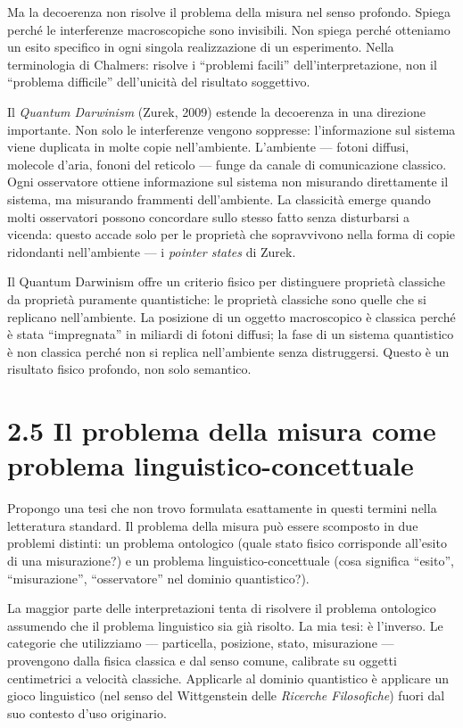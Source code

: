 \documentclass[11.5pt,a4paper,openany]{book}
\theoremstyle{remark}
\begin{document}
Ma la decoerenza non risolve il problema della misura nel senso profondo. Spiega perché le interferenze macroscopiche sono invisibili. Non spiega perché otteniamo un esito specifico in ogni singola realizzazione di un esperimento. Nella terminologia di Chalmers: risolve i ``problemi facili'' dell'interpretazione, non il ``problema difficile'' dell'unicità del risultato soggettivo.

Il \textit{Quantum Darwinism} (Zurek, 2009) estende la decoerenza in una direzione importante. Non solo le interferenze vengono soppresse: l'informazione sul sistema viene duplicata in molte copie nell'ambiente. L'ambiente --- fotoni diffusi, molecole d'aria, fononi del reticolo --- funge da canale di comunicazione classico. Ogni osservatore ottiene informazione sul sistema non misurando direttamente il sistema, ma misurando frammenti dell'ambiente. La classicità emerge quando molti osservatori possono concordare sullo stesso fatto senza disturbarsi a vicenda: questo accade solo per le proprietà che sopravvivono nella forma di copie ridondanti nell'ambiente --- i \textit{pointer states} di Zurek.

Il Quantum Darwinism offre un criterio fisico per distinguere proprietà classiche da proprietà puramente quantistiche: le proprietà classiche sono quelle che si replicano nell'ambiente. La posizione di un oggetto macroscopico è classica perché è stata ``impregnata'' in miliardi di fotoni diffusi; la fase di un sistema quantistico è non classica perché non si replica nell'ambiente senza distruggersi. Questo è un risultato fisico profondo, non solo semantico.

\section{2.5 Il problema della misura come problema linguistico-concettuale}

Propongo una tesi che non trovo formulata esattamente in questi termini nella letteratura standard. Il problema della misura può essere scomposto in due problemi distinti: un problema ontologico (quale stato fisico corrisponde all'esito di una misurazione?) e un problema linguistico-concettuale (cosa significa ``esito'', ``misurazione'', ``osservatore'' nel dominio quantistico?).

La maggior parte delle interpretazioni tenta di risolvere il problema ontologico assumendo che il problema linguistico sia già risolto. La mia tesi: è l'inverso. Le categorie che utilizziamo --- particella, posizione, stato, misurazione --- provengono dalla fisica classica e dal senso comune, calibrate su oggetti centimetrici a velocità classiche. Applicarle al dominio quantistico è applicare un gioco linguistico (nel senso del Wittgenstein delle \textit{Ricerche Filosofiche}) fuori dal suo contesto d'uso originario.
\end{document}
